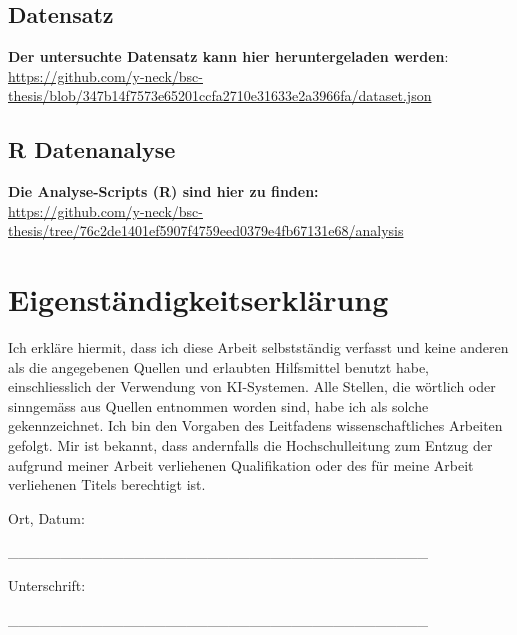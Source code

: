 \documentclass[12pt,a4paper]{article}        %
\begin{document}
\subsection{Datensatz}
\label{appendix_dataset}
\begin{tcolorbox}[
    width=\textwidth,    %
    boxrule=1pt,         %
    arc=0pt,             %
    colback=white,       %
    left=6pt, right=6pt, top=6pt, bottom=6pt
  ]
  \textbf{Der untersuchte Datensatz kann hier heruntergeladen werden}: \\
  \url{https://github.com/y-neck/bsc-thesis/blob/347b14f7573e65201ccfa2710e31633e2a3966fa/dataset.json}
\end{tcolorbox}
\subsection{R Datenanalyse}
\label{appendix_analysis}
\begin{tcolorbox}[
    width=\textwidth,
    boxrule=1pt,
    arc=0pt,
    colback=white,
    left=6pt, right=6pt, top=6pt, bottom=6pt
  ]
  \textbf{Die Analyse-Scripts (R) sind hier zu finden:}\\
  \url{https://github.com/y-neck/bsc-thesis/tree/76c2de1401ef5907f4759eed0379e4fb67131e68/analysis}
\end{tcolorbox}
\pagebreak
\section*{Eigenständigkeitserklärung}
Ich erkläre hiermit, dass ich diese Arbeit selbstständig verfasst und keine anderen als die angegebenen Quellen und erlaubten Hilfsmittel benutzt habe, einschliesslich der Verwendung von KI-Systemen. Alle Stellen, die wörtlich oder sinngemäss aus Quellen entnommen worden sind, habe ich als solche gekennzeichnet. Ich bin den Vorgaben des Leitfadens wissenschaftliches Arbeiten gefolgt. Mir ist bekannt, dass andernfalls die Hochschulleitung zum Entzug der aufgrund meiner Arbeit verliehenen Qualifikation oder des für meine Arbeit verliehenen Titels berechtigt ist.

Ort, Datum:

________________________________________

Unterschrift:

________________________________________
\end{document}
